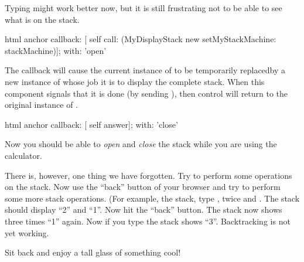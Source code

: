 \documentclass[a4paper,10pt,twoside]{book}
\begin{document}
Typing might work better now, but it is still frustrating not to be able to see what is
on the stack.


\begin{code}{}
html anchor
	callback: [ self call: (MyDisplayStack new setMyStackMachine: stackMachine)];
	with: 'open'
\end{code}

The callback will cause the current instance of  to be temporarily replacedby a new instance of  whose job it is to display the complete stack.
When this component signals that it is done (\ie by sending ), then
control will return to the original instance of .


\begin{code}{}
html anchor
	callback: [ self answer];
	with: 'close'
\end{code}

Now you should be able to \emph{open} and \emph{close} the stack while you are using the
calculator.

There is, however, one thing we have forgotten.
Try to perform some operations on the stack.
Now use the ``back'' button of your browser and try to perform some more stack
operations.
(For example,  the stack, type ,  twice and \menu {+}.
The stack should display ``2'' and ``1''.
Now hit the ``back'' button.
The stack now shows three times ``1'' again.
Now if you type \menu{+} the stack shows ``3''.
Backtracking is not yet working.


Sit back and enjoy a tall glass of something cool!

\end{document}
